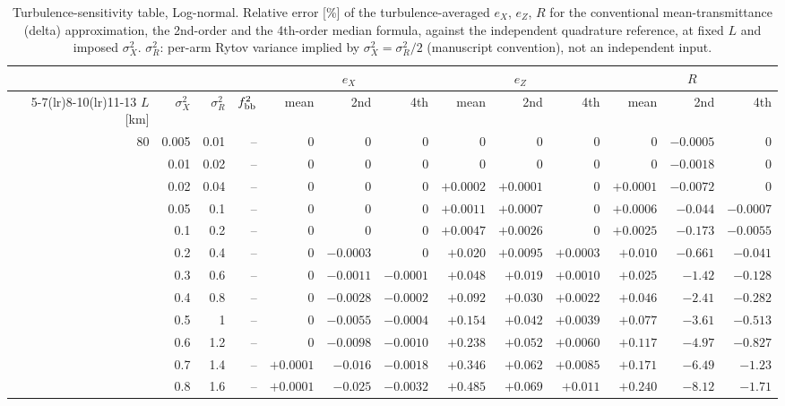 \documentclass[11pt,a4paper]{article}
\begin{document}
\begin{table}[htbp]
\centering\scriptsize
\caption{Turbulence-sensitivity table, Log-normal. Relative error [\%] of the turbulence-averaged $e_X$, $e_Z$, $R$ for the conventional mean-transmittance (delta) approximation, the 2nd-order and the 4th-order median formula, against the independent quadrature reference, at fixed $L$ and imposed $\sigma_X^2$. $\sigma_R^2$: per-arm Rytov variance implied by $\sigma_X^2=\sigma_R^2/2$ (manuscript convention), not an independent input.}
\label{tab:sens-LN}
\begin{tabular}{rrrrrrrrrrrrr}
\toprule
 & & & & \multicolumn{3}{c}{$e_X$} & \multicolumn{3}{c}{$e_Z$} & \multicolumn{3}{c}{$R$}\\
\cmidrule(lr){5-7}\cmidrule(lr){8-10}\cmidrule(lr){11-13}
$L$ [km] & $\sigma_X^2$ & $\sigma_R^2$ & $f_{\rm bb}^2$ & mean & 2nd & 4th & mean & 2nd & 4th & mean & 2nd & 4th\\
\midrule
80 & 0.005 & 0.01 & -- & $0$ & $0$ & $0$ & $0$ & $0$ & $0$ & $0$ & $-0.0005$ & $0$ \\
 & 0.01 & 0.02 & -- & $0$ & $0$ & $0$ & $0$ & $0$ & $0$ & $0$ & $-0.0018$ & $0$ \\
 & 0.02 & 0.04 & -- & $0$ & $0$ & $0$ & $+0.0002$ & $+0.0001$ & $0$ & $+0.0001$ & $-0.0072$ & $0$ \\
 & 0.05 & 0.1 & -- & $0$ & $0$ & $0$ & $+0.0011$ & $+0.0007$ & $0$ & $+0.0006$ & $-0.044$ & $-0.0007$ \\
 & 0.1 & 0.2 & -- & $0$ & $0$ & $0$ & $+0.0047$ & $+0.0026$ & $0$ & $+0.0025$ & $-0.173$ & $-0.0055$ \\
 & 0.2 & 0.4 & -- & $0$ & $-0.0003$ & $0$ & $+0.020$ & $+0.0095$ & $+0.0003$ & $+0.010$ & $-0.661$ & $-0.041$ \\
 & 0.3 & 0.6 & -- & $0$ & $-0.0011$ & $-0.0001$ & $+0.048$ & $+0.019$ & $+0.0010$ & $+0.025$ & $-1.42$ & $-0.128$ \\
 & 0.4 & 0.8 & -- & $0$ & $-0.0028$ & $-0.0002$ & $+0.092$ & $+0.030$ & $+0.0022$ & $+0.046$ & $-2.41$ & $-0.282$ \\
 & 0.5 & 1 & -- & $0$ & $-0.0055$ & $-0.0004$ & $+0.154$ & $+0.042$ & $+0.0039$ & $+0.077$ & $-3.61$ & $-0.513$ \\
 & 0.6 & 1.2 & -- & $0$ & $-0.0098$ & $-0.0010$ & $+0.238$ & $+0.052$ & $+0.0060$ & $+0.117$ & $-4.97$ & $-0.827$ \\
 & 0.7 & 1.4 & -- & $+0.0001$ & $-0.016$ & $-0.0018$ & $+0.346$ & $+0.062$ & $+0.0085$ & $+0.171$ & $-6.49$ & $-1.23$ \\
 & 0.8 & 1.6 & -- & $+0.0001$ & $-0.025$ & $-0.0032$ & $+0.485$ & $+0.069$ & $+0.011$ & $+0.240$ & $-8.12$ & $-1.71$ \\

\end{tabular}
\end{table}
\end{document}
